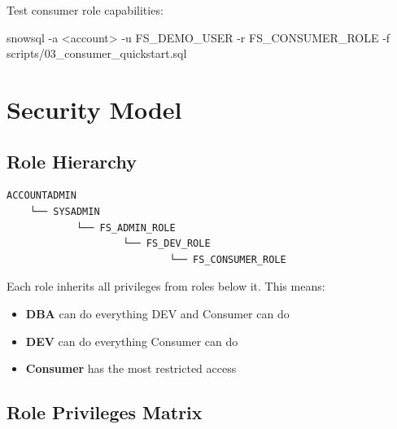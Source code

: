 \documentclass[
  letterpaper,
  DIV=11,
  numbers=noendperiod]{scrreprt}
\newenvironment{Shaded}{\begin{snugshade}}{\end{snugshade}}
\newcommand{\AttributeTok}[1]{\textcolor[rgb]{0.40,0.45,0.13}{#1}}
\newcommand{\ExtensionTok}[1]{\textcolor[rgb]{0.00,0.23,0.31}{#1}}
\newcommand{\NormalTok}[1]{\textcolor[rgb]{0.00,0.23,0.31}{#1}}
\newcommand{\OperatorTok}[1]{\textcolor[rgb]{0.37,0.37,0.37}{#1}}
\providecommand{\tightlist}{%
  \setlength{\itemsep}{0pt}\setlength{\parskip}{0pt}}\usepackage{longtable,booktabs,array}
\begin{document}
Test consumer role capabilities:

\begin{Shaded}
\begin{Highlighting}[]
\ExtensionTok{snowsql} \AttributeTok{{-}a} \OperatorTok{\textless{}}\NormalTok{account}\OperatorTok{\textgreater{}}\NormalTok{ {-}u FS\_DEMO\_USER }\AttributeTok{{-}r}\NormalTok{ FS\_CONSUMER\_ROLE }\AttributeTok{{-}f}\NormalTok{ scripts/03\_consumer\_quickstart.sql}
\end{Highlighting}
\end{Shaded}

\hypertarget{security-model}{%
\section{Security Model}\label{security-model}}

\hypertarget{role-hierarchy}{%
\subsection{Role Hierarchy}\label{role-hierarchy}}

\begin{verbatim}
ACCOUNTADMIN
    └── SYSADMIN
            └── FS_ADMIN_ROLE
                    └── FS_DEV_ROLE
                            └── FS_CONSUMER_ROLE
\end{verbatim}

Each role inherits all privileges from roles below it. This means:

\begin{itemize}
\tightlist
\item
  \textbf{DBA} can do everything DEV and Consumer can do
\item
  \textbf{DEV} can do everything Consumer can do
\item
  \textbf{Consumer} has the most restricted access
\end{itemize}

\hypertarget{role-privileges-matrix}{%
\subsection{Role Privileges Matrix}\label{role-privileges-matrix}}
\end{document}
